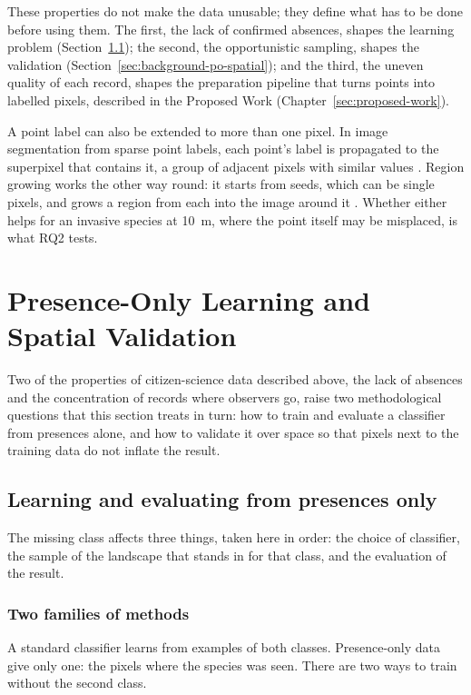 These properties do not make the data unusable; they define what has
to be done before using them. The first, the lack of confirmed
absences, shapes the learning problem
(Section~\ref{sec:background-po-background}); the second, the
opportunistic sampling, shapes the validation
(Section~\ref{sec:background-po-spatial}); and the third, the uneven
quality of each record, shapes the preparation pipeline that turns
points into labelled pixels, described in the Proposed Work
(Chapter~\ref{sec:proposed-work}).

A point label can also be extended to more than one pixel. In image
segmentation from sparse point labels, each point's label is
propagated to the superpixel that contains it, a group of adjacent
pixels with similar values \cite{rivier2024}. Region growing works
the other way round: it starts from seeds, which can be single pixels,
and grows a region from each into the image around it
\cite{adams1994}. Whether either helps for an invasive species at
10~m, where the point itself may be misplaced, is what RQ2 tests.

\section{Presence-Only Learning and Spatial Validation}
\label{sec:background-po}

Two of the properties of citizen-science data described above, the
lack of absences and the concentration of records where observers go,
raise two methodological questions that this section treats in turn:
how to train and evaluate a classifier from presences alone, and how
to validate it over space so that pixels next to the training data do
not inflate the result.

\subsection{Learning and evaluating from presences only}
\label{sec:background-po-background}

The missing class affects three things, taken here in order: the
choice of classifier, the sample of the landscape that stands in for
that class, and the evaluation of the result.

\subsubsection*{Two families of methods}

A standard classifier learns from examples of both classes.
Presence-only data give only one: the pixels where the species was
seen. There are two ways to train without the second class.

